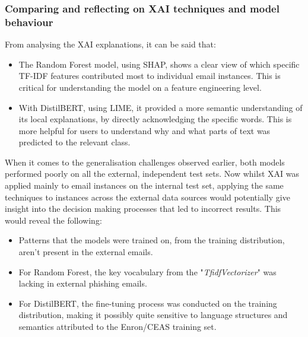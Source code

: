 
\subsubsection*{Comparing and reflecting on XAI techniques and model behaviour}
From analysing the XAI explanations, it can be said that:

\begin{itemize}
  \item The Random Forest model, using SHAP, shows a clear view of which specific TF-IDF features contributed most to individual email instances. This is critical for understanding the model on a feature engineering level.
  \item With DistilBERT, using LIME, it provided a more semantic understanding of its local explanations, by directly acknowledging the specific words. This is more helpful for users to understand why and what parts of text was predicted to the relevant class.
\end{itemize}

\noindent When it comes to the generalisation challenges observed earlier, both models performed poorly on all the external, independent test sets. Now whilst XAI was applied mainly to email instances on the internal test set, applying the same techniques to instances across the external data sources would potentially give insight into the decision making processes that led to incorrect results. This would reveal the following:

\begin{itemize}
  \item Patterns that the models were trained on, from the training distribution, aren't present in the external emails.
  \item For Random Forest, the key vocabulary from the "\textit{TfidfVectorizer}" was lacking in external phishing emails.
  \item For DistilBERT, the fine-tuning process was conducted on the training distribution, making it possibly quite sensitive to language structures and semantics attributed to the Enron/CEAS training set.
\end{itemize}
